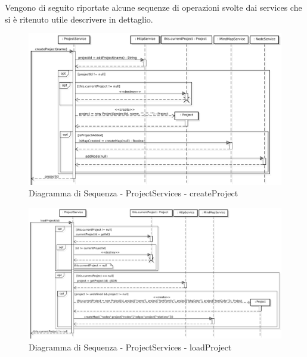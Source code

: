 \label{seqFrontEnd}
Vengono di seguito riportate alcune sequenze di operazioni svolte dai services che si è ritenuto utile descrivere in dettaglio.
{}
\begin{center}
\begin{figure}[h]
\centering
\includegraphics[scale=0.32,keepaspectratio]{diagrammi/sequenza/FrontEnd/services/createProject.pdf}
\caption{Diagramma di Sequenza - ProjectServices - createProject}
\end{figure}
\end{center}
\FloatBarrier
{}
\begin{center}
\begin{figure}[h]
\centering
\includegraphics[scale=0.27,keepaspectratio]{diagrammi/sequenza/FrontEnd/services/loadProject.pdf}
\caption{Diagramma di Sequenza - ProjectServices - loadProject}
\end{figure}
\end{center}
